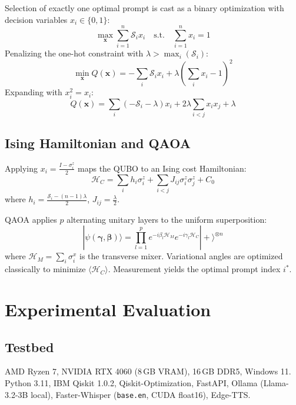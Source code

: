 \documentclass[conference]{IEEEtran}
\begin{document}
Selection of exactly one optimal prompt is cast as a binary optimization with decision variables $x_i \in \{0,1\}$:
\begin{equation}
\max_{\mathbf{x}} \sum_{i=1}^n \mathcal{S}_i x_i \quad \text{s.t.} \quad \sum_{i=1}^n x_i = 1
\end{equation}
Penalizing the one-hot constraint with $\lambda > \max_i(\mathcal{S}_i)$:
\begin{equation}
\min_{\mathbf{x}} Q(\mathbf{x}) = -\sum_i \mathcal{S}_i x_i + \lambda\!\left(\sum_i x_i - 1\right)^2
\end{equation}
Expanding with $x_i^2 = x_i$:
\begin{equation}
Q(\mathbf{x}) = \sum_i (-\mathcal{S}_i - \lambda) x_i + 2\lambda \sum_{i<j} x_i x_j + \lambda
\end{equation}

\subsection{Ising Hamiltonian and QAOA}

Applying $x_i = \frac{I - \sigma_i^z}{2}$ maps the QUBO to an Ising cost Hamiltonian:
\begin{equation}
\mathcal{H}_C = \sum_i h_i \sigma_i^z + \sum_{i<j} J_{ij} \sigma_i^z \sigma_j^z + C_0
\end{equation}
where $h_i = \frac{\mathcal{S}_i - (n-1)\lambda}{2}$, $J_{ij} = \frac{\lambda}{2}$.

QAOA applies $p$ alternating unitary layers to the uniform superposition:
\begin{equation}
|\psi(\boldsymbol{\gamma}, \boldsymbol{\beta})\rangle = \prod_{l=1}^p e^{-i\beta_l \mathcal{H}_M} e^{-i\gamma_l \mathcal{H}_C} |+\rangle^{\otimes n}
\end{equation}
where $\mathcal{H}_M = \sum_i \sigma_i^x$ is the transverse mixer. Variational angles are optimized classically to minimize $\langle \mathcal{H}_C \rangle$. Measurement yields the optimal prompt index $i^*$.

\section{Experimental Evaluation}

\subsection{Testbed}
AMD Ryzen 7, NVIDIA RTX 4060 (8\,GB VRAM), 16\,GB DDR5, Windows 11. Python 3.11, IBM Qiskit 1.0.2,
Qiskit-Optimization, FastAPI, Ollama (Llama-3.2-3B local), Faster-Whisper (\texttt{base.en}, CUDA float16), Edge-TTS.
\end{document}
